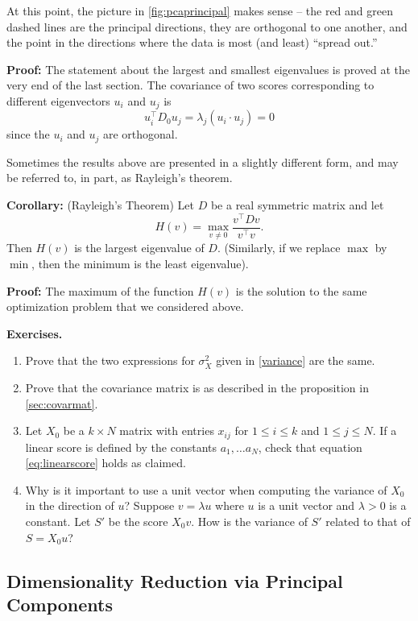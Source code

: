 \documentclass[
]{article}
\begin{document}
At this point, the picture in \cref{fig:pcaprincipal} makes sense -- the
red and green dashed lines are the principal directions, they are
orthogonal to one another, and the point in the directions where the
data is most (and least) ``spread out.''

\textbf{Proof:} The statement about the largest and smallest eigenvalues
is proved at the very end of the last section. The covariance of two
scores corresponding to different eigenvectors \(u_{i}\) and \(u_{j}\)
is \[u_{i}^{\intercal}D_{0}u_{j} = \lambda_{j}(u_{i}\cdot u_{j}) = 0\]
since the \(u_{i}\) and \(u_{j}\) are orthogonal.

Sometimes the results above are presented in a slightly different form,
and may be referred to, in part, as Rayleigh's theorem.

\textbf{Corollary:} (Rayleigh's Theorem) Let \(D\) be a real symmetric
matrix and let \[
H(v) = \max_{v\not = 0}\frac{v^{\intercal}Dv}{v^{\intercal}v}.
\] Then \(H(v)\) is the largest eigenvalue of \(D\). (Similarly, if we
replace \(\max\) by \(\min\), then the minimum is the least eigenvalue).

\textbf{Proof:} The maximum of the function \(H(v)\) is the solution to
the same optimization problem that we considered above.

\textbf{Exercises.}

\begin{enumerate}
\def\labelenumi{\arabic{enumi}.}
\item
  Prove that the two expressions for \(\sigma_{X}^2\) given in
  \cref{variance} are the same.
\item
  Prove that the covariance matrix is as described in the proposition in
  \ref{sec:covarmat}.
\item
  Let \(X_{0}\) be a \(k\times N\) matrix with entries \(x_{ij}\) for
  \(1\le i\le k\) and \(1\le j\le N\). If a linear score is defined by
  the constants \(a_{1},\ldots a_{N}\), check that equation
  \cref{eq:linearscore} holds as claimed.
\item
  Why is it important to use a unit vector when computing the variance
  of \(X_{0}\) in the direction of \(u\)? Suppose \(v=\lambda u\) where
  \(u\) is a unit vector and \(\lambda>0\) is a constant. Let \(S'\) be
  the score \(X_{0}v\). How is the variance of \(S'\) related to that of
  \(S=X_{0}u\)?
\end{enumerate}

\hypertarget{dimensionality-reduction-via-principal-components}{%
\subsection{Dimensionality Reduction via Principal
Components}\label{dimensionality-reduction-via-principal-components}}
\end{document}

